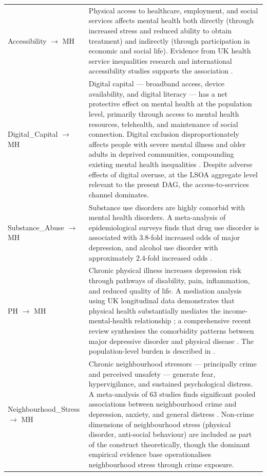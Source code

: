 \begin{longtable}{@{}p{3.5cm}p{11.5cm}@{}}
\addlinespace
Accessibility $\to$ MH & Physical access to healthcare, employment, and social services affects mental health both directly (through increased stress and reduced ability to obtain treatment) and indirectly (through participation in economic and social life). Evidence from UK health service inequalities research and international accessibility studies supports the association \citep{lowther-payne_understanding_2023, mseke_impact_2024}. \\
\addlinespace
Digital\_Capital $\to$ MH & Digital capital — broadband access, device availability, and digital literacy — has a net protective effect on mental health at the population level, primarily through access to mental health resources, telehealth, and maintenance of social connection. Digital exclusion disproportionately affects people with severe mental illness and older adults in deprived communities, compounding existing mental health inequalities \citep{greer_digital_2019, spanakis_digital_2021}. Despite adverse effects of digital overuse, at the LSOA aggregate level relevant to the present DAG, the access-to-services channel dominates. \\
\addlinespace
Substance\_Abuse $\to$ MH & Substance use disorders are highly comorbid with mental health disorders. A meta-analysis of epidemiological surveys finds that drug use disorder is associated with 3.8-fold increased odds of major depression, and alcohol use disorder with approximately 2.4-fold increased odds \citep{lai_prevalence_2015}. \\
\addlinespace
PH $\to$ MH & Chronic physical illness increases depression risk through pathways of disability, pain, inflammation, and reduced quality of life. A mediation analysis using UK longitudinal data demonstrates that physical health substantially mediates the income-mental-health relationship \citep{ohrnberger_relationship_2017}; a comprehensive recent review synthesises the comorbidity patterns between major depressive disorder and physical disease \citep{berk_comorbidity_2023}. The population-level burden is described in \citet{prince_no_2007}. \\
\addlinespace
Neighbourhood\_Stress $\to$ MH & Chronic neighbourhood stressors — principally crime and perceived unsafety — generate fear, hypervigilance, and sustained psychological distress. A meta-analysis of 63 studies finds significant pooled associations between neighbourhood crime and depression, anxiety, and general distress \citep{baranyi_impact_2021}. Non-crime dimensions of neighbourhood stress (physical disorder, anti-social behaviour) are included as part of the construct theoretically, though the dominant empirical evidence base operationalises neighbourhood stress through crime exposure. \\

\end{longtable}
